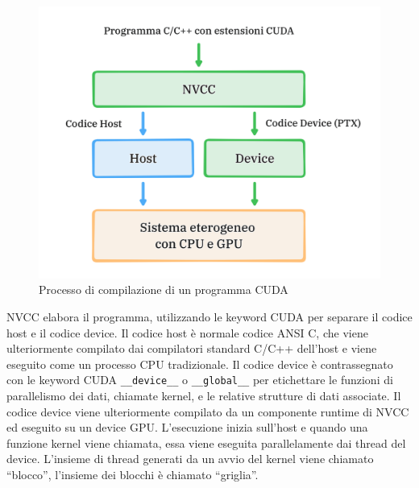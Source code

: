 \begin{figure}[ht]
    \centering
    \includegraphics[width=.9\linewidth]{images/chapter2/nvcc.png}
    \caption{Processo di compilazione di un programma CUDA}
    \label{fig:nvcc}
\end{figure}

NVCC elabora il programma, utilizzando le keyword CUDA per separare il codice host e il codice device. Il codice host è normale codice ANSI C, che viene ulteriormente compilato dai compilatori standard C/C++ dell'host e viene eseguito come un processo CPU tradizionale. Il codice device è contrassegnato con le keyword CUDA \verb|__device__| o \verb|__global__| per etichettare le funzioni di parallelismo dei dati, chiamate kernel, e le relative strutture di dati associate. Il codice device viene ulteriormente compilato da un componente runtime di NVCC ed eseguito su un device GPU. L'esecuzione inizia sull'host e quando una funzione kernel viene chiamata, essa viene eseguita parallelamente dai thread del device. L'insieme di thread generati da un avvio del kernel viene chiamato ``blocco'', l'insieme dei blocchi è chiamato ``griglia''.

